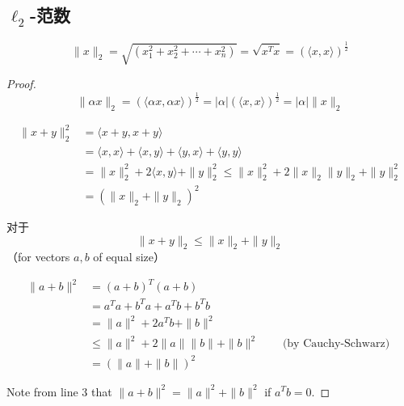 \subsection{$ \ell_{2} $-范数}

\begin{example}
    \begin{equation} \|x\|_{2}=\sqrt{\left(x_{1}^{2}+x_{2}^{2}+\cdots+x_{n}^{2}\right)}=\sqrt{x^{T} x}=(\langle x, x\rangle)^{\frac{1}{2}} \end{equation}
\end{example}

\begin{proof}
    \begin{equation} \|\alpha x\|_{2}=(\langle\alpha x, \alpha x\rangle)^{\frac{1}{2}}=|\alpha|(\langle x, x\rangle)^{\frac{1}{2}}=|\alpha|\|x\|_{2} \end{equation}
    
    \begin{equation}\begin{aligned} \|x+y\|_{2}^{2}&=\langle x+y, x+y\rangle 
    \\ &=\langle x, x\rangle+\langle x, y\rangle+\langle y, x\rangle+\langle y, y\rangle  \\
    &=\|x\|_{2}^{2}+2\langle x, y\rangle+\|y\|_{2}^{2} \leq\|x\|_{2}^{2}+2\|x\|_{2}\|y\|_{2}+\|y\|_{2}^{2}\\
    &=\left(\|x\|_{2}+\|y\|_{2}\right)^{2} \end{aligned}\end{equation}

    对于\begin{equation} \|x+y\|_{2} \leq\|x\|_{2}+\|y\|_{2} \end{equation}
    （for vectors $ a, b $ of equal size）

\begin{equation} \begin{array}{rlr}\|a+b\|^{2} & =(a+b)^{T}(a+b) & \\ & =a^{T} a+b^{T} a+a^{T} b+b^{T} b & \\ & =\|a\|^{2}+2 a^{T} b+\|b\|^{2} & \\ & \leq\|a\|^{2}+2\|a\|\|b\|+\|b\|^{2} \quad & \text { (by Cauchy-Schwarz) } \\ & =(\|a\|+\|b\|)^{2} & \end{array} \end{equation}



Note from line 3 that $ \|a+b\|^{2}=\|a\|^{2}+\|b\|^{2} $ if $ a^{T} b=0 $.
\end{proof}

